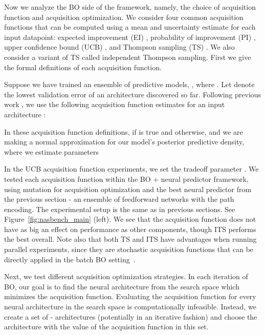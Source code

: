 \documentclass[11pt]{article}
\numberwithin{equation}{section}
\numberwithin{figure}{section}
\theoremstyle{plain}
\theoremstyle{definition}
\begin{document}
Now we analyze the BO side of the framework, namely, 
the choice of acquisition function and acquisition optimization.
We consider four common acquisition functions that can be computed using a mean and 
uncertainty estimate for each input datapoint:
expected improvement (EI) \cite{movckus1975bayesian},
probability of improvement (PI) \cite{kushner1964new},
upper confidence bound (UCB) \cite{srinivas2009gaussian},
and Thompson sampling (TS) \cite{thompson1933likelihood}.
We also consider a variant of TS called independent Thompson sampling.
First we give the formal definitions of each acquisition function.

Suppose we have trained an ensemble of  predictive models,
,
where .
Let  denote the lowest validation error of an architecture discovered so
far.
Following previous work \cite{neiswanger2019probo},
we use the following acquisition function estimates for an
input architecture :


In these acquisition function definitions, 
 if  is true and  
otherwise, and we are making a normal
approximation for our model's posterior predictive
density, where we estimate parameters 


In the UCB acquisition function experiments, we set the tradeoff parameter .
We tested each acquisition function within the BO + neural predictor framework,
using mutation for acquisition optimization and
the best neural predictor from the previous section - an ensemble of
feedforward networks with the path encoding. 
The experimental setup is the same as in previous sections.
See Figure~\ref{fig:nasbench_main} (left).
We see that the acquisition function does not have as big an effect on performance
as other components, though ITS performs the best overall.
Note also that both TS and ITS have advantages when running parallel
experiments, since they are stochastic acquisition functions that can be directly
applied in the batch BO setting~\cite{kandasamy2018parallelised}.


Next, we test different acquisition optimization strategies.
In each iteration of BO, our goal is to find the neural architecture from the search 
space which minimizes the acquisition function.
Evaluating the acquisition function for every neural architecture
in the search space is computationally infeasible.
Instead, we create a set of - architectures
(potentially in an iterative fashion) and choose the architecture with
the value of the acquisition function in this set.
\end{document}
